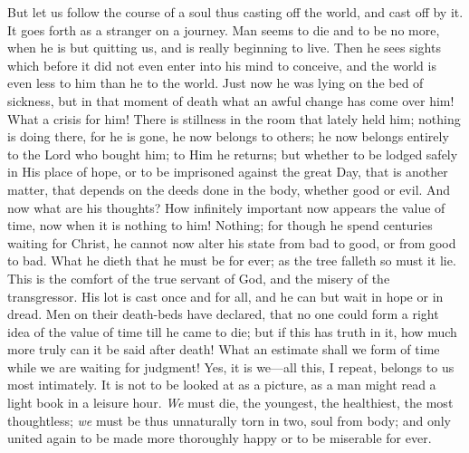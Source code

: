 But let us follow the course of a soul thus casting off the world,
and cast off by it. It goes forth as a stranger on a journey. Man
seems to die and to be no more, when he is but quitting us, and is
really beginning to live. Then he sees sights which before it did not
even enter into his mind to conceive, and the world is even less to
him than he to the world. Just now he was lying on the bed of
sickness, but in that moment of death what an awful change has come
over him! What a crisis for him! There is stillness in the room that
lately held him; nothing is doing there, for he is gone, he now
belongs to others; he now belongs entirely to the Lord who bought him;
to Him he returns; but whether to be lodged safely in His place of
hope, or to be imprisoned against the great Day, that is another
matter, that depends on the deeds done in the body, whether good or
evil. And now what are his thoughts? How infinitely important now
appears the value of time, now when it is nothing to him! Nothing; for
though he spend centuries waiting for Christ, he cannot now alter his
state from bad to good, or from good to bad. What he dieth that he
must be for ever; as the tree falleth so must it lie. This is the
comfort of the true servant of God, and the misery of the
transgressor. His lot is cast once and for all, and he can but wait in
hope or in dread. Men on their death-beds have declared, that no one
could form a right idea of the value of time till he came to die; but
if this has truth in it, how much more truly can it be said after
death! What an estimate shall we form of time while we are waiting for
judgment! Yes, it is we—all this, I repeat, belongs to us most
intimately. It is not to be looked at as a picture, as a man might
read a light book in a leisure hour. \emph{We} must die, the youngest,
the healthiest, the most thoughtless; \emph{we} must be thus
unnaturally torn in two, soul from body; and only united again to be
made more thoroughly happy or to be miserable for ever.

